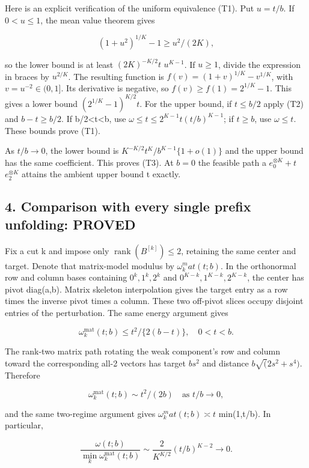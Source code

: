 \documentclass[
  11pt,
]{article}
\begin{document}
Here is an explicit verification of the uniform equivalence (T1). Put
\(u=t/b\). If \(0<u\le 1\), the mean value theorem gives

\[
 (1+u^2)^{1/K}-1\ge u^2/(2K),
\]

so the lower bound is at least \((2K)^{-K/2}t\) \(u^{K-1}\). If
\(u\ge 1\), divide the expression in braces by \(u^{2/K}\). The
resulting function is \(f(v)=(1+v)^{1/K}-v^{1/K}\), with
\(v=u^{-2}\in (0,1]\). Its derivative is negative, so
\(f(v)\ge f(1)=2^{1/K}-1\). This gives a lower bound
\((2^{1/K}-1)^{K/2}t\). For the upper bound, if \(t\le b/2\) apply (T2)
and \(b-t\ge b/2\). If b/2\textless t\textless b, use
\(\omega \le t\le 2^{K-1}t(t/b)^{K-1}\); if \(t\ge b\), use
\(\omega \le t\). These bounds prove (T1).

As \(t/b\to 0\), the lower bound is \(K^{-K/2}t^K/b^{K-1}\{1+o(1)\}\)
and the upper bound has the same coefficient. This proves (T3). At
\(b=0\) the feasible path a \(e_0^{\otimes K}+t\) \(e_2^{\otimes K}\)
attains the ambient upper bound t exactly.

\subsection{4. Comparison with every single prefix unfolding:
PROVED}\label{comparison-with-every-single-prefix-unfolding-proved}

Fix a cut k and impose only \(\operatorname{rank}(B^{[k]})\le 2\),
retaining the same center and target. Denote that matrix-model modulus
by \(\omega _k^mat(t;b)\). In the orthonormal row and column bases
containing \(0^k,1^k,2^k\) and \(0^{K-k},1^{K-k},2^{K-k}\), the center
has pivot diag(a,b). Matrix skeleton interpolation gives the target
entry as a row times the inverse pivot times a column. These two
off-pivot slices occupy disjoint entries of the perturbation. The same
energy argument gives

\[
 \omega_k^{\mathrm{mat}}(t;b)\le t^2/\{2(b-t)\},\quad0<t<b.
\]

The rank-two matrix path rotating the weak component's row and column
toward the corresponding all-2 vectors has target \(bs^{2}\) and
distance \(b\sqrt (2s^{2}+s^{4})\). Therefore

\[
 \omega_k^{\mathrm{mat}}(t;b)\sim t^2/(2b)
 \quad\text{as }t/b\to0,
\]

and the same two-regime argument gives \(\omega _k^mat(t;b)\asymp t\)
min(1,t/b). In particular,

\[
 \frac{\omega(t;b)}{\min_k\omega_k^{\mathrm{mat}}(t;b)}
 \sim\frac2{K^{K/2}}(t/b)^{K-2}\longrightarrow0.
\]
\end{document}
